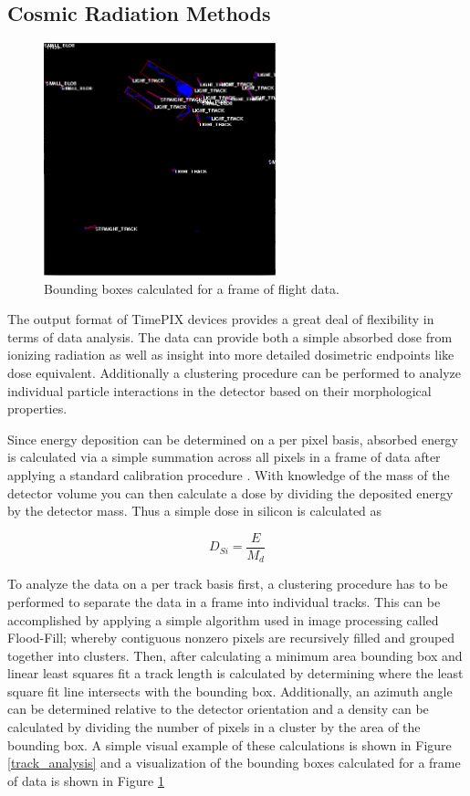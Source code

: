\subsection{Cosmic Radiation Methods}
\label{sec:Rad-Methods}

\begin{figure}[H]
	\begin{center}
	\includegraphics[width=0.6\textwidth]{figures/clustering.png}
	\caption{Bounding boxes calculated for a frame of flight data.}
	\label{clusterframe}
	\end{center}
\end{figure}

The output format of TimePIX devices provides a great deal of flexibility in terms of data analysis. The data can provide both a simple absorbed dose from ionizing radiation as well as insight into more detailed dosimetric endpoints like dose equivalent. Additionally a clustering procedure can be performed to analyze individual particle interactions in the detector based on their morphological properties.

 Since energy deposition can be determined on a per pixel basis, absorbed energy is calculated via a simple summation across all pixels in a frame of data after applying a standard calibration procedure \cite{mpjakubek}. With knowledge of the mass of the detector volume you can then calculate a dose by dividing the deposited energy by the detector mass. Thus a simple dose in silicon is calculated as

\[D_{Si} = \frac{E}{M_{d}}\]

To analyze the data on a per track basis first, a clustering procedure has to be performed to separate the data in a frame into individual tracks. This can be accomplished by applying a simple algorithm used in image processing called Flood-Fill; whereby contiguous nonzero pixels are recursively filled and grouped together into clusters. Then, after calculating a minimum area bounding box and linear least squares fit a track length is calculated by determining where the least square fit line intersects with the bounding box. Additionally, an azimuth angle can be determined relative to the detector orientation and a density can be calculated by dividing the number of pixels in a cluster by the area of the bounding box. A simple visual example of these calculations is shown in Figure \ref{track_analysis} and a visualization of the bounding boxes calculated for a frame of data is shown in Figure \ref{clusterframe}


